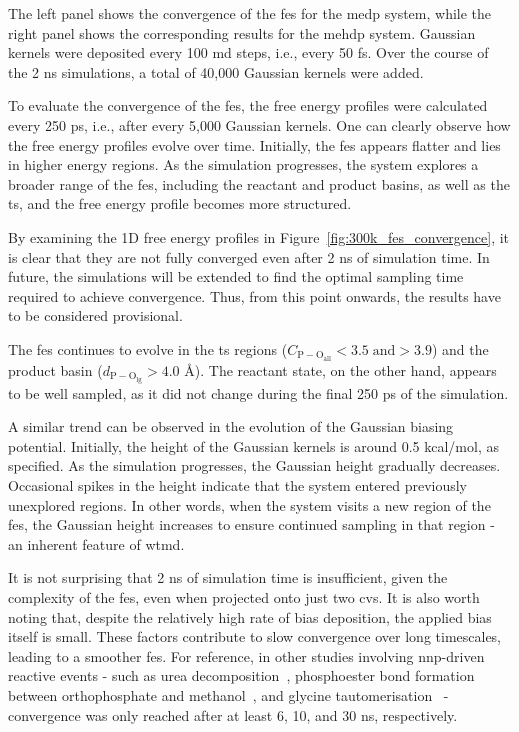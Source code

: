 The left panel shows the convergence of the \ac{fes} for the \ac{medp} system, while the right panel shows the corresponding results for the \ac{mehdp} system. Gaussian kernels were deposited every 100 \ac{md} steps, i.e., every 50 fs. Over the course of the 2 ns simulations, a total of 40,000 Gaussian kernels were added.

To evaluate the convergence of the \ac{fes}, the free energy profiles were calculated every 250 ps, i.e., after every 5,000 Gaussian kernels. One can clearly observe how the free energy profiles evolve over time. Initially, the \ac{fes} appears flatter and lies in higher energy regions. As the simulation progresses, the system explores a broader range of the \ac{fes}, including the reactant and product basins, as well as the \ac{ts}, and the free energy profile becomes more structured.

By examining the 1D free energy profiles in Figure~\ref{fig:300k_fes_convergence}, it is clear that they are not fully converged even after 2 ns of simulation time. In future, the simulations will be extended to find the optimal sampling time required to achieve convergence. Thus, from this point onwards, the results have to be considered provisional.

The \ac{fes} continues to evolve in the \ac{ts} regions ($C_\mathrm{P-O_{\mathrm{all}}}<3.5 \; \mathrm{and} >3.9$) and the product basin ($d_\mathrm{P-O_{\mathrm{lg}}}>4.0$ \AA). The reactant state, on the other hand, appears to be well sampled, as it did not change during the final 250 ps of the simulation.

A similar trend can be observed in the evolution of the Gaussian biasing potential. Initially, the height of the Gaussian kernels is around 0.5 kcal/mol, as specified. As the simulation progresses, the Gaussian height gradually decreases. Occasional spikes in the height indicate that the system entered previously unexplored regions. In other words, when the system visits a new region of the \ac{fes}, the Gaussian height increases to ensure continued sampling in that region - an inherent feature of \ac{wtmd}.

It is not surprising that 2 ns of simulation time is insufficient, given the complexity of the \ac{fes}, even when projected onto just two \acp{cv}. It is also worth noting that, despite the relatively high rate of bias deposition, the applied bias itself is small. These factors contribute to slow convergence over long timescales, leading to a smoother \ac{fes}. For reference, in other studies involving \ac{nnp}-driven reactive events - such as urea decomposition~\citep{yangUsingMetadynamicsBuild2022}, phosphoester bond formation between orthophosphate and methanol~\citep{benayadPrebioticChemicalReactivity2024}, and glycine tautomerisation~\citep{zhangIntramolecularWaterMediated2024} - convergence was only reached after at least 6, 10, and 30 ns, respectively.

